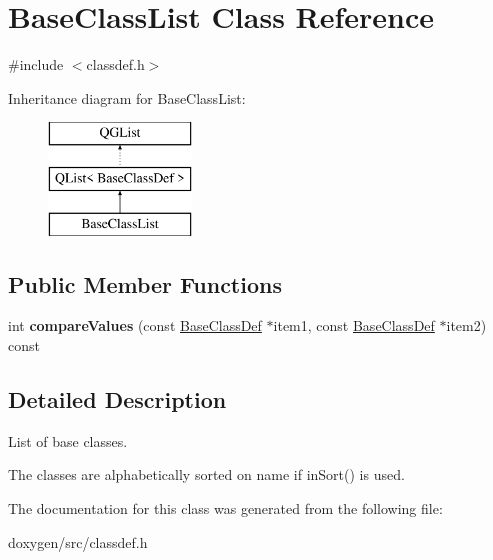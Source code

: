 \hypertarget{class_base_class_list}{}\section{Base\+Class\+List Class Reference}
\label{class_base_class_list}


{\ttfamily \#include $<$classdef.\+h$>$}

Inheritance diagram for Base\+Class\+List\+:\begin{figure}[H]
\begin{center}
\leavevmode
\includegraphics[height=3.000000cm]{class_base_class_list}
\end{center}
\end{figure}
\subsection*{Public Member Functions}
\begin{DoxyCompactItemize}
\item 
\mbox{\label{class_base_class_list_afe7ccc845228bb4782bcdc018258eda2}} 
int {\bfseries compare\+Values} (const \mbox{\hyperlink{struct_base_class_def}{Base\+Class\+Def}} $\ast$item1, const \mbox{\hyperlink{struct_base_class_def}{Base\+Class\+Def}} $\ast$item2) const
\end{DoxyCompactItemize}


\subsection{Detailed Description}
List of base classes.

The classes are alphabetically sorted on name if in\+Sort() is used. 

The documentation for this class was generated from the following file\+:\begin{DoxyCompactItemize}
\item 
doxygen/src/classdef.\+h\end{DoxyCompactItemize}
